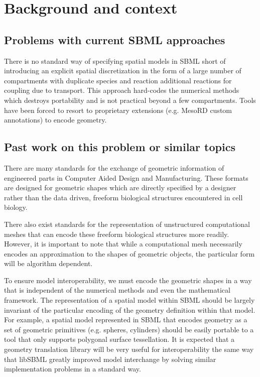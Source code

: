 
\section{Background and context}
\label{background}

\subsection{Problems with current SBML approaches}
There is no standard way of specifying spatial models in SBML short of introducing an explicit spatial discretization in the form of a large number of compartments with duplicate species and reaction  additional reactions for coupling due to transport.  This approach hard-codes the numerical methods  which destroys portability and is not practical beyond a few compartments.  Tools have been forced to resort to proprietary extensions (e.g. MesoRD custom annotations) to encode geometry. 

\subsection{Past work on this problem or similar topics}
There are many standards for the exchange of geometric information of engineered parts in Computer Aided Design and Manufacturing.  These formats are designed for geometric shapes which are directly specified by a designer rather than the data driven, freeform biological structures encountered in cell biology.  

There also exist standards for the representation of unstructured computational meshes that can encode these freeform biological structures more readily.  However, it is important to note that while a computational mesh necessarily encodes an approximation to the shapes of geometric objects, the particular form will be algorithm dependent.  

To ensure model interoperability, we must encode the geometric shapes in a way that is independent of the numerical methods and even the mathematical framework.  The representation of a spatial model within SBML should be largely invariant of the particular encoding of the geometry definition within that model.  For example, a spatial model represented in SBML that encodes geometry as a set of geometric primitives (e.g. spheres, cylinders) should be easily portable to a tool that only supports polygonal surface tessellation.  It is expected that a geometry translation library will be very useful for interoperability the same way that libSBML greatly improved model interchange by solving similar implementation problems in a standard way.




